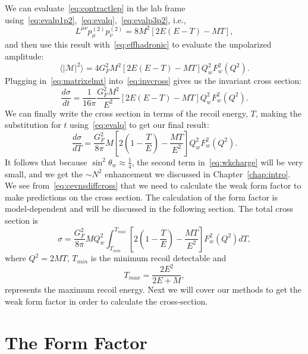 We can evaluate~\eqref{eq:contractlep} in the lab frame using~\eqref{eq:evalp1p2},~\eqref{eq:evalq},~\eqref{eq:evalp3p2}, i.e.,
\begin{equation}
L^{\mu \nu}p_{\mu}^{(2)}p_{\nu}^{(2)} = 8M^2 \left[ 2E(E-T)-MT \right],
\end{equation}
and then use this result with~\eqref{eq:effhadronic} to evaluate the unpolarized amplitude:
\begin{equation}\label{eq:matrixelmt}
\langle |\mathcal{M}|^2 \rangle = 4G_F^2M^2 \left[ 2E(E-T)-MT \right] Q_{w}^2 F_{w}^2(Q^2).
\end{equation}
Plugging in~\eqref{eq:matrixelmt} into~\eqref{eq:invcross} gives us the invariant cross section:
\begin{equation}
\frac{d\sigma}{dt} = \frac{1}{16\pi} \frac{G_F^2M^2}{E^2}\left[ 2E(E-T)-MT \right] Q_{w}^2 F_{w}^2(Q^2).
\end{equation}
We can finally write the cross section in terms of the recoil energy, $T$, making the substitution for $t$ using~\eqref{eq:evalq} to get our final result:
\begin{equation}\label{eq:cevnsdiffcross}
\boxed{
\frac{d\sigma}{dT} = \frac{G_F^2}{8\pi}M \left[ 2\left(1-\frac{T}{E}\right) - \frac{MT}{E^2} \right] Q_{w}^2 F_{w}^2(Q^2)
}.
\end{equation}
It follows that because $ \sin^2\theta _w \approx \frac{1}{4} $, the second term in~\eqref{eq:wkcharge} will be very small, and we get the $ \sim N^2 $ enhancement we discussed in Chapter~\ref{chap:intro}. We see from~\eqref{eq:cevnsdiffcross} that we need to calculate the weak form factor to make predictions on the cross section. The calculation of the form factor is model-dependent and will be discussed in the following section. The total cross section is
\begin{equation}\label{eq:totcross}
\boxed{
\sigma = \frac{G_F^2}{8\pi}M Q_{w}^2 \int_{T_{min}}^{ T_{max}}\left[ 2 \left( 1- \frac{T}{E} \right) -\frac{MT}{E^2} \right] F_{w}^2(Q^2) dT
},
\end{equation} 
where $Q^2=2MT$, $T_{min}$ is the minimum recoil detectable and 
\begin{equation}
T_{max}=\frac{2E^2}{2E+M},
\end{equation}
represents the maximum recoil energy. Next we will cover our methods to get the weak form factor in order to calculate the cross-section. 

\section{The Form Factor}

